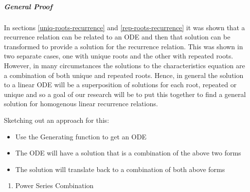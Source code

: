 \documentclass[a4paper,11pt,twoside]{article}
\begin{document}
\subparagraph{General Proof}
\label{general-gen-func-proof}
In sections \ref{uniq-roots-recurrence} and \ref{rep-roots-recurrence}
it was shown that a recurrence relation can be related to an ODE and then that
solution can be transformed to provide a solution for the recurrence relation.
This was shown in two separate cases, one with unique roots and the other with
repeated roots. However, in many circumstances the solutions to the characteristics
equation are a combination of both unique and repeated roots. Hence, in general the
solution to a linear ODE will be a superposition of solutions for each root, repeated
or unique and so a goal of our research will be to put this together to find a general
solution for homogenous linear recurrence relations.

Sketching out an approach for this:

\begin{itemize}
\item Use the Generating function to get an ODE
\item The ODE will have a solution that is a combination of the above two forms
\item The solution will translate back to a combination of both above forms
\end{itemize}
\begin{enumerate}
\item Power Series Combination
\label{power-series-comb}
\end{enumerate}
\end{document}

